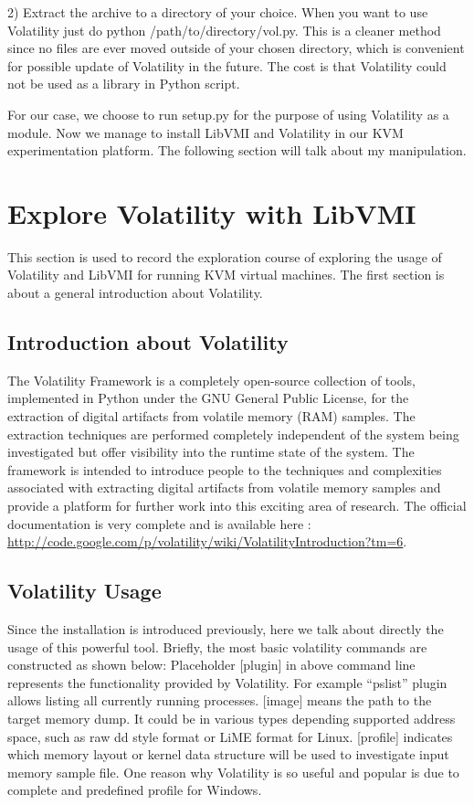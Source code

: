 2) Extract the archive to a directory of your choice. When you want to use Volatility just do python /path/to/directory/vol.py. This is a 
cleaner method since no files are ever moved outside of your chosen directory, which is convenient for possible update of Volatility in the 
future. The cost is that Volatility could not be used as a library in Python script.

For our case, we choose to run setup.py for the purpose of using Volatility as a module. Now we manage to install LibVMI and Volatility in 
our KVM experimentation platform. The following section will talk about my manipulation.

\section{Explore Volatility with LibVMI}
This section is used to record the exploration course of exploring the usage of Volatility and LibVMI for running KVM virtual machines. 
The first section is about a general introduction about Volatility.
\subsection{Introduction about Volatility}
The Volatility Framework is a completely open-source collection of tools, implemented in Python under the GNU General Public License, 
for the extraction of digital artifacts from volatile memory (RAM) samples. The extraction techniques are performed completely independent 
of the system being investigated but offer visibility into the runtime state of the system. The framework is intended to introduce people 
to the techniques and complexities associated with extracting digital artifacts from volatile memory samples and provide a platform for 
further work into this exciting area of research. The official documentation is very complete and is available here
: \url{http://code.google.com/p/volatility/wiki/VolatilityIntroduction?tm=6}.
\subsection{Volatility Usage}
Since the installation is introduced previously, here we talk about directly the usage of this powerful tool. Briefly, the most basic 
volatility commands are constructed as shown below:
Placeholder [plugin] in above command line represents the functionality provided by Volatility. For example “pslist” plugin allows listing all 
currently running processes. [image] means the path to the target memory dump. It could be in various types depending supported address 
space, such as raw dd style format or LiME \cite{Reference35} format for Linux. [profile] indicates which memory layout or kernel data structure will 
be used to investigate input memory sample file. One reason why Volatility is so useful and popular is due to complete and predefined 
profile for Windows.

